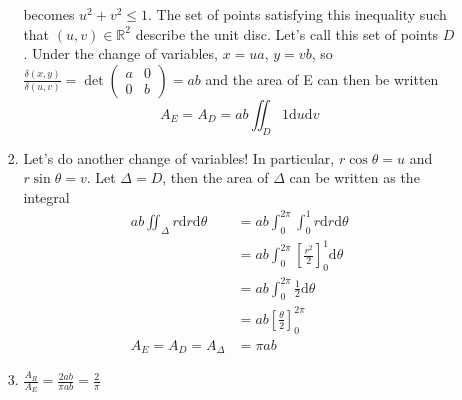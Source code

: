 \documentclass[10pt]{article}
\begin{document}
\begin{enumerate}
\begin{enumerate}
\begin{enumerate}
                            becomes $u^2 + v^2 \leq 1$. The set of points
                            satisfying this inequality such that $(u,v) \in
                            \mathbb{R}^2$ describe the unit disc.
                            Let's call this set of points $D$. Under the change
                            of variables, $x = ua$, $y = vb$, so
                            $
                                \tfrac{\delta(x,y)}{\delta(u,v)} = \det\left(
                                \begin{array}{cc}
                                    a & 0 \\
                                    0 & b
                                \end{array}
                                \right) = ab
                            $ and the area of E can then be written
                            $$
                            A_E = A_D = ab\iint_D 1 \text{d}u\text{d}v
                            $$
                        \pagebreak
                        \item Let's do another change of variables! In
                            particular, $r\cos\theta = u$ and $r\sin\theta = v$.
                            Let $\Delta = D$, then the area of $\Delta$ can be
                            written as the integral
                            \begin{align*}
                                ab\iint_\Delta r \text{d}r\text{d}\theta &= ab\int_0^{2\pi}\int_0^1 r \text{d}r\text{d}\theta \\
                                &= ab\int_0^{2\pi}\left[\frac{r^2}{2}\right]_0^1\text{d}\theta \\
                                &= ab\int_0^{2\pi}\frac{1}{2}\text{d}\theta \\
                                &= ab\left[\frac{\theta}{2}\right]_0^{2\pi} \\
                                A_E = A_D = A_\Delta &= \pi ab
                            \end{align*}
                        \item $\frac{A_R}{A_E} = \frac{2ab}{\pi ab} = \frac{2}{\pi}$


\end{enumerate}
\end{enumerate}
\end{enumerate}
\end{document}
